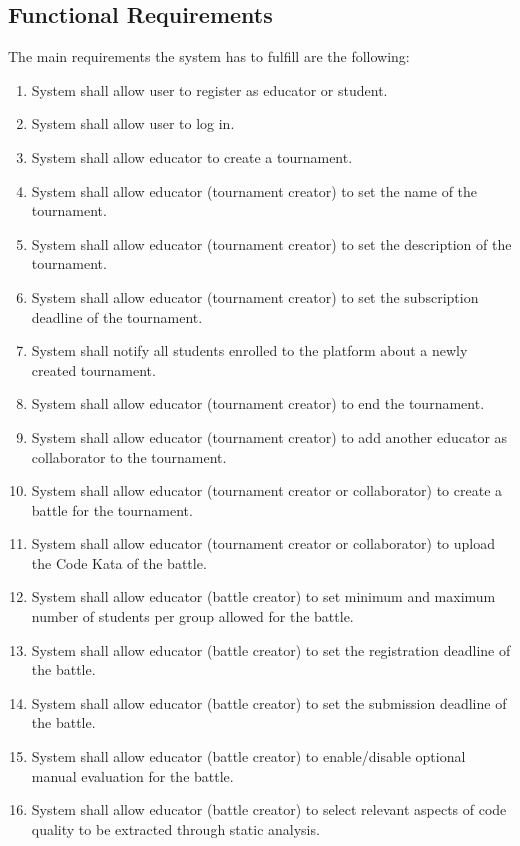 \subsection{Functional Requirements}
The main requirements the system has to fulfill are the following:
\begin{enumerate}[label=$\bullet$ \textbf{R\arabic*:}]
    \item System shall allow user to register as educator or student.
    \item System shall allow user to log in.
    \item System shall allow educator to create a tournament.
    \item System shall allow educator (tournament creator) to set the name of the tournament.
    \item System shall allow educator (tournament creator) to set the description of the tournament.
    \item System shall allow educator (tournament creator) to set the subscription deadline of the tournament.
    \item System shall notify all students enrolled to the platform about a newly created tournament.
    \item System shall allow educator (tournament creator) to end the tournament.
    \item System shall allow educator (tournament creator) to add another educator as collaborator to the tournament.
    \item System shall allow educator (tournament creator or collaborator) to create a battle for the tournament.
    \item System shall allow educator (tournament creator or collaborator) to upload the Code Kata of the battle.
    \item System shall allow educator (battle creator) to set minimum and maximum number of students per group allowed for the battle.
    \item System shall allow educator (battle creator) to set the registration deadline of the battle.
    \item System shall allow educator (battle creator) to set the submission deadline of the battle.
    \item System shall allow educator (battle creator) to enable/disable optional manual evaluation for the battle.
    \item System shall allow educator (battle creator) to select relevant aspects of code quality to be extracted through static analysis.

\end{enumerate}
